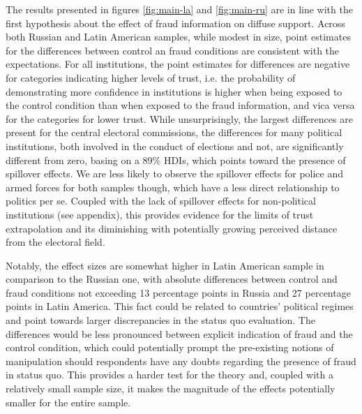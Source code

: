 \documentclass[11pt, ngerman,english,a4]{article}
\begin{document}
The results presented in figures \ref{fig:main-la} and \ref{fig:main-ru} are in line with the first hypothesis about the effect of fraud information on diffuse support. Across both Russian and Latin American samples, while modest in size, point estimates for the differences between control an fraud conditions are consistent with the expectations. For all institutions, the point estimates for differences are negative for categories indicating higher levels of trust, i.e. the probability of demonstrating more confidence in institutions is higher when being exposed to the control condition than when exposed to the fraud information, and vica versa for the categories for lower trust. While unsurprisingly, the largest differences are present for the central electoral commissions, the differences for many political institutions, both involved in the conduct of elections and not, are significantly different from zero, basing on a 89\% HDIs, which points toward the presence of spillover effects. We are less likely to observe the spillover effects for police and armed forces for both samples though, which have a less direct relationship to politics per se. Coupled with the lack of spillover effects for non-political institutions (see appendix), this provides evidence for the limits of trust extrapolation and its diminishing with potentially growing perceived distance from the electoral field. 

Notably, the effect sizes are somewhat higher in Latin American sample in comparison to the Russian one, with absolute differences between control and fraud conditions not exceeding 13 percentage points in Russia and 27 percentage points in Latin America. This fact could be related to countries' political regimes and point towards larger discrepancies in the status quo evaluation. The differences would be less pronounced between explicit indication of fraud and the control condition, which could potentially prompt the pre-existing notions of manipulation should respondents have any doubts regarding the presence of fraud in status quo. This provides a harder test for the theory and, coupled with a relatively small sample size, it makes the magnitude of the effects potentially smaller for the entire sample. 
\end{document}
